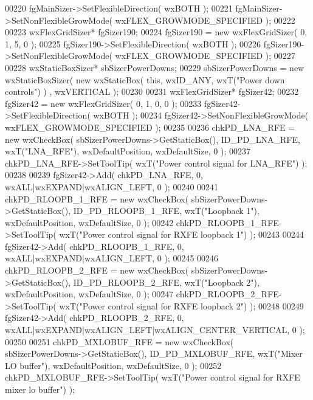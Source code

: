 \begin{DoxyCode}
00220     fgMainSizer->SetFlexibleDirection( wxBOTH );
00221     fgMainSizer->SetNonFlexibleGrowMode( wxFLEX\_GROWMODE\_SPECIFIED );
00222     
00223     wxFlexGridSizer* fgSizer190;
00224     fgSizer190 = \textcolor{keyword}{new} wxFlexGridSizer( 0, 1, 5, 0 );
00225     fgSizer190->SetFlexibleDirection( wxBOTH );
00226     fgSizer190->SetNonFlexibleGrowMode( wxFLEX\_GROWMODE\_SPECIFIED );
00227     
00228     wxStaticBoxSizer* sbSizerPowerDowns;
00229     sbSizerPowerDowns = \textcolor{keyword}{new} wxStaticBoxSizer( \textcolor{keyword}{new} wxStaticBox( \textcolor{keyword}{this}, wxID\_ANY, wxT(\textcolor{stringliteral}{"Power down controls"}) )
      , wxVERTICAL );
00230     
00231     wxFlexGridSizer* fgSizer42;
00232     fgSizer42 = \textcolor{keyword}{new} wxFlexGridSizer( 0, 1, 0, 0 );
00233     fgSizer42->SetFlexibleDirection( wxBOTH );
00234     fgSizer42->SetNonFlexibleGrowMode( wxFLEX\_GROWMODE\_SPECIFIED );
00235     
00236     chkPD_LNA_RFE = \textcolor{keyword}{new} wxCheckBox( sbSizerPowerDowns->GetStaticBox(), 
      ID_PD_LNA_RFE, wxT(\textcolor{stringliteral}{"LNA\_RFE"}), wxDefaultPosition, wxDefaultSize, 0 );
00237     chkPD_LNA_RFE->SetToolTip( wxT(\textcolor{stringliteral}{"Power control signal for LNA\_RFE"}) );
00238     
00239     fgSizer42->Add( chkPD_LNA_RFE, 0, wxALL|wxEXPAND|wxALIGN\_LEFT, 0 );
00240     
00241     chkPD_RLOOPB_1_RFE = \textcolor{keyword}{new} wxCheckBox( sbSizerPowerDowns->GetStaticBox(), 
      ID_PD_RLOOPB_1_RFE, wxT(\textcolor{stringliteral}{"Loopback 1"}), wxDefaultPosition, wxDefaultSize, 0 );
00242     chkPD_RLOOPB_1_RFE->SetToolTip( wxT(\textcolor{stringliteral}{"Power control signal for RXFE loopback 1"}) );
00243     
00244     fgSizer42->Add( chkPD_RLOOPB_1_RFE, 0, wxALL|wxEXPAND|wxALIGN\_LEFT, 0 );
00245     
00246     chkPD_RLOOPB_2_RFE = \textcolor{keyword}{new} wxCheckBox( sbSizerPowerDowns->GetStaticBox(), 
      ID_PD_RLOOPB_2_RFE, wxT(\textcolor{stringliteral}{"Loopback 2"}), wxDefaultPosition, wxDefaultSize, 0 );
00247     chkPD_RLOOPB_2_RFE->SetToolTip( wxT(\textcolor{stringliteral}{"Power control signal for RXFE loopback 2"}) );
00248     
00249     fgSizer42->Add( chkPD_RLOOPB_2_RFE, 0, wxALL|wxEXPAND|wxALIGN\_LEFT|wxALIGN\_CENTER\_VERTICAL, 0 );
00250     
00251     chkPD_MXLOBUF_RFE = \textcolor{keyword}{new} wxCheckBox( sbSizerPowerDowns->GetStaticBox(), 
      ID_PD_MXLOBUF_RFE, wxT(\textcolor{stringliteral}{"Mixer LO buffer"}), wxDefaultPosition, wxDefaultSize, 0 );
00252     chkPD_MXLOBUF_RFE->SetToolTip( wxT(\textcolor{stringliteral}{"Power control signal for RXFE mixer lo buffer"}) );

\end{DoxyCode}
